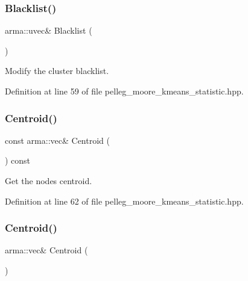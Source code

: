 \subsubsection{Blacklist()\hspace{0.1cm}{\footnotesize\ttfamily [2/2]}}
{\footnotesize\ttfamily arma\+::uvec\& Blacklist (\begin{DoxyParamCaption}{ }\end{DoxyParamCaption})\hspace{0.3cm}{\ttfamily [inline]}}



Modify the cluster blacklist. 



Definition at line 59 of file pelleg\+\_\+moore\+\_\+kmeans\+\_\+statistic.\+hpp.

\mbox{\label{classmlpack_1_1kmeans_1_1PellegMooreKMeansStatistic_a8d1b09bb5ee8c048e57746774a6e502e}} 
\subsubsection{Centroid()\hspace{0.1cm}{\footnotesize\ttfamily [1/2]}}
{\footnotesize\ttfamily const arma\+::vec\& Centroid (\begin{DoxyParamCaption}{ }\end{DoxyParamCaption}) const\hspace{0.3cm}{\ttfamily [inline]}}



Get the node\textquotesingle{}s centroid. 



Definition at line 62 of file pelleg\+\_\+moore\+\_\+kmeans\+\_\+statistic.\+hpp.

\mbox{\label{classmlpack_1_1kmeans_1_1PellegMooreKMeansStatistic_a656ee900ec6d5a1548d3023d7df8bb9a}} 
\subsubsection{Centroid()\hspace{0.1cm}{\footnotesize\ttfamily [2/2]}}
{\footnotesize\ttfamily arma\+::vec\& Centroid (\begin{DoxyParamCaption}{ }\end{DoxyParamCaption})\hspace{0.3cm}{\ttfamily [inline]}}



